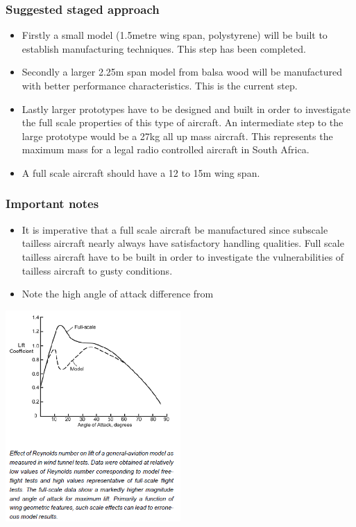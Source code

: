 \documentclass{beamer}
\begin{document}
\begin{frame}
\frametitle{Suggested staged approach}

\begin{itemize}
\item Firstly a small model (1.5metre wing span, polystyrene) will be built to establish manufacturing techniques.  This step has been completed.
\item Secondly a larger 2.25m span model from balsa wood will be manufactured with better performance characteristics.  This is the current step.
\item Lastly larger prototypes have to be designed and built in order to investigate the full scale properties of this type of aircraft.  An intermediate step to the large prototype would be a 27kg all up mass aircraft.  This represents the maximum mass for a legal radio controlled aircraft in South Africa.
\item A full scale aircraft should have a 12 to 15m wing span.  
\end{itemize}

\end{frame}


\begin{frame}
\frametitle{Important notes}

\begin{itemize}
\item It is imperative that a full scale aircraft 
be manufactured since subscale tailless aircraft nearly always have satisfactory handling qualities.  Full scale tailless aircraft 
have to be built in order to investigate the vulnerabilities of tailless aircraft to gusty conditions.
\item Note the high angle of attack difference from \cite{ModelFlightNASA}
\end{itemize}

\includegraphics[width = 0.5\textwidth]{Pictures/ModelAeroVSFullSize.png}

\end{frame}
\end{document}
